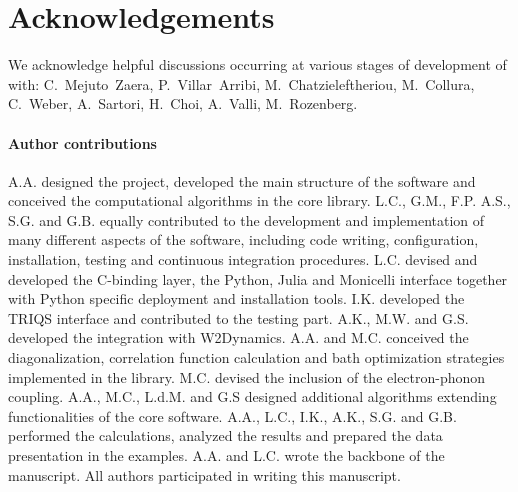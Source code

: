 \documentclass[edipack_sp.tex]{subfiles}
\begin{document}


\section*{Acknowledgements}
We acknowledge helpful discussions occurring at various stages of development of \NAME with: C.~Mejuto~Zaera, P.~Villar~Arribi, M.~Chatzieleftheriou, M.~Collura, C.~Weber, A.~Sartori, H.~Choi, A.~Valli, M.~Rozenberg.    

\paragraph{Author contributions}
A.A. designed the project, developed the main structure of the software and conceived the computational algorithms in the core library. 
L.C., G.M., F.P. A.S., S.G. and G.B.  equally contributed to the development and implementation of many different aspects of the  software, including code writing, configuration, installation, testing and continuous integration procedures. 
L.C. devised and developed the C-binding layer, the Python, Julia and Monicelli interface together with Python specific deployment and installation tools. 
I.K. developed the TRIQS interface and contributed to the testing part. 
A.K., M.W. and G.S. developed the integration with W2Dynamics.  
A.A. and M.C. conceived the diagonalization, correlation function  calculation and bath optimization strategies implemented in the library. M.C. devised the inclusion of the electron-phonon coupling. 
A.A., M.C., L.d.M. and G.S designed additional algorithms extending functionalities of the core software.   
A.A., L.C., I.K., A.K., S.G. and G.B. performed the calculations, analyzed the results and prepared the data presentation in the examples.
A.A. and L.C. wrote the backbone of the manuscript.
All authors participated in writing this manuscript. 

\end{document}
